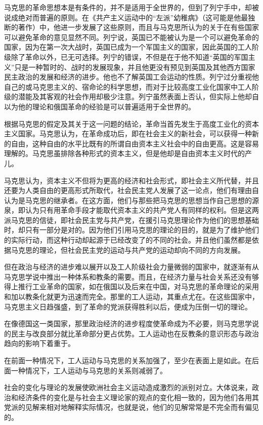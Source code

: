 \documentclass[12pt,oneside]{book}
\begin{document}
\begin{common-format}
马克思的革命思想本是有条件的，并不是适用于全世界的，但到了列宁手中，却被说成绝对而普遍的原则。在《共产主义运动中的“左派”幼稚病》（这可能是他最独断的著作）中，他进一步发展了这些原则，而且与马克思所认为的关于在有些国家可以避免革命的意见显然不同。列宁说，英国已不能被认为是一个可以避免革命的国家，因为在第一次大战时，英国已成为一个军国主义的国家，因此英国的工人阶级除了革命以外，已无可选择。列宁的错误，不但是在于他不知道“英国的军国主义”只是一种暂时的、战时的发展现象，并且他更没有预见到英国及其他西方国家民主政治的发展和经济的进步。他也不了解英国工会运动的性质。列宁过分重视他自己的或马克思主义的、宿命论的科学思想，而对于比较高度工业化国家中工人阶级的潜能及其客观的社会作用却极少注意。列宁虽然表面上否认，但实际上他却自以为他的理论和俄国革命的经验是可以普遍适用于全世界的。

根据马克思的假定及其关于这一问题的结论，革命当首先发生于高度工业化的资本主义国家。马克思认为，在革命成功后，即在社会主义的新社会，可以获得一种新的自由，这种自由的水平比既有的所谓自由资本主义社会中的自由更高。这是容易理解的。马克思虽排除各种形式的资本主义，但是他却是自由资本主义时代的产儿。

马克思认为，资本主义不但将为更高的经济和社会形式，即社会主义所代替，并且还要为人类自由的更高形式所取代，社会民主党人发展了这一论点，他们有理由自认为是马克思的继承者。在这方面，他们与那些把马克思的思想当作自己思想的源泉，即认为只有用革命手段才能取代资本主义的共产党人有同样的权利。但是这两派马克思的信徒，即社会民主党与共产党，在援引马克思理论作为他们的思想基础时，却只有一部分是对的。因为他们引用马克思的理论的目的，就是为了维护他们的实际行动，而这种行动却起源于已经改变了的不同的社会。并且他们虽然都是依据马克思的理论，但社会民主党的运动与共产党的运动却向不同的方向发展。

但在政治与经济的进步难以展开以及工人阶级社会力量微弱的国家中，就逐渐有从马克思学说中推出一种体系和教条的需要。而且，在经济力量与社会关系还没有够得上推行工业革命的国家，如在俄国以及后来在中国，对马克思的革命理论的采用和加以教条化就更为迅速而完全。那里的工人运动，其重点尤在。在这些国家中，马克思主义日趋强盛，到了革命的党派获得胜利以后，便成为压倒一切的理论。

在像德国这一类国家，那里政治经济的进步程度使革命成为不必要，则马克思学说的民主与改良部分就比革命部分更占优势。工人运动也在反教条的意识形态与政治趋向的影响下着重于。

在前面一种情况下，工人运动与马克思的关系加强了，至少在表面上是如此。在后面一种情况下，工人运动与马克思的关系则减弱了。

社会的变化与理论的发展使欧洲社会主义运动造成激烈的派别对立。大体说来，政治和经济条件的变化是与社会主义理论家的观点的变化相一致的，因为他们各用其党派的见解来相对地解释实际情况，也就是说，他们的见解常常是不完全而有偏见的。


\end{common-format}
\end{document}
